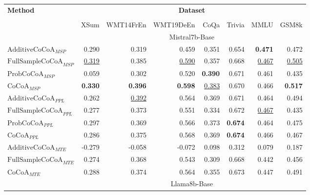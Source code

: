 \begin{table*}[h!]
\footnotesize
\centering

\begin{tabular}{lrrrrrrr}
\toprule
    \multirow{2}{*}{\textbf{Method}}  & \multicolumn{7}{c}{\textbf{Dataset}}  \\ 
      \cmidrule(lr){2-8}  \\
  & XSum & WMT14FrEn & WMT19DeEn & CoQa & Trivia & MMLU & GSM8k \\
  \midrule

\rowcolor[gray]{0.9} & \multicolumn{7}{c}{Mistral7b-Base} \\

\midrule

$\text{AdditiveCoCoA}_{MSP}$ & 0.290& 0.319& 0.459& 0.351& 0.654& \textbf{0.471}& 0.472\\
$\text{FullSampleCoCoA}_{MSP}$ & \underline{0.319}& 0.385& \underline{0.590}& 0.357& 0.668& \underline{0.467}& \underline{0.505}\\
$\text{ProbCoCoA}_{MSP}$ & 0.059& 0.302& 0.520& \textbf{0.390}& 0.671& 0.461& 0.435\\
$\text{CoCoA}_{MSP}$ & \textbf{0.330}& \textbf{0.396}& \textbf{0.598}& \underline{0.383}& 0.670& 0.466& \textbf{0.517}\\

\midrule

$\text{AdditiveCoCoA}_{PPL}$ & 0.262& \underline{0.392}& 0.564& 0.369& 0.671& 0.464& 0.494\\
$\text{FullSampleCoCoA}_{PPL}$ & 0.277& 0.373& 0.551& 0.334& 0.672& \underline{0.467}& 0.435\\
$\text{ProbCoCoA}_{PPL}$ & 0.297& 0.369& 0.566& 0.373& \textbf{0.674}& 0.464& 0.475\\
$\text{CoCoA}_{PPL}$ & 0.286& 0.375& 0.568& 0.369& \textbf{0.674}& 0.466& 0.467\\

\midrule

$\text{AdditiveCoCoA}_{MTE}$ & -0.279& -0.058& -0.072& 0.098& 0.312& 0.079& 0.187\\
$\text{FullSampleCoCoA}_{MTE}$ & 0.274& 0.368& 0.543& 0.309& 0.668& 0.442& 0.456\\
$\text{CoCoA}_{MTE}$ & 0.288& 0.374& 0.564& 0.355& 0.673& 0.447& 0.491\\
\midrule

\rowcolor[gray]{0.9} & \multicolumn{7}{c}{Llama8b-Base} \\

\midrule


\end{tabular}
\end{table*}
